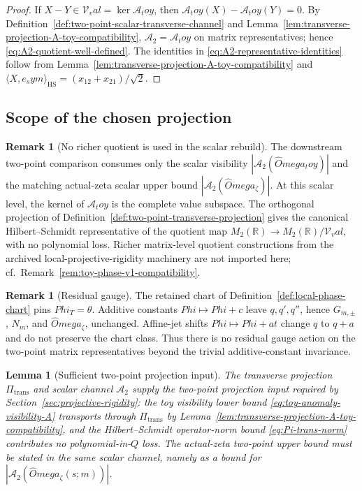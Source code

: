 \documentclass[11pt,a4paper]{amsart}
\def\Omega{Omega}%
\def\Phi{Phi}%
\def\toy{toy}%
\def\val{val}%
\def\sym{sym}%
\numberwithin{equation}{section}
\theoremstyle{plain}
\newtheorem{lemma}[theorem]{Lemma}
\theoremstyle{definition}
\newtheorem{remark}[theorem]{Remark}
\newcommand{\z}{\zeta}
\newcommand{\Om}{\Omega}
\newcommand{\Ph}{\Phi}
\newcommand{\sym}{\mathrm{sym}}
\newcommand{\toy}{\mathrm{toy}}
\newcommand{\val}{\mathrm{val}}
\newcommand{\trans}{\mathrm{trans}}
\begin{document}
\begin{proof}
If \(X-Y\in\mathcal V_\val=\ker\mathcal A_\toy\), then
\(\mathcal A_\toy(X)-\mathcal A_\toy(Y)=0\).  By
Definition~\ref{def:two-point-scalar-transverse-channel} and
Lemma~\ref{lem:transverse-projection-A-toy-compatibility},
\(\mathcal A_2=\mathcal A_\toy\) on matrix representatives; hence
\eqref{eq:A2-quotient-well-defined}.  The identities in
\eqref{eq:A2-representative-identities} follow from
Lemma~\ref{lem:transverse-projection-A-toy-compatibility} and
\(\langle X,e_\sym\rangle_{\mathrm{HS}}=(x_{12}+x_{21})/\sqrt2\).
\end{proof}

\subsection{Scope of the chosen projection}
\label{subsec:transverse-projection-scope}

\begin{remark}[No richer quotient is used in the scalar rebuild]
\label{rem:transverse-projection-no-richer-quotient}
The downstream two-point comparison consumes only the scalar
visibility \(|\mathcal A_2(\widehat\Om_\toy)|\) and the matching
actual-zeta scalar upper bound
\(|\mathcal A_2(\widehat\Om_\z)|\).  At this scalar level, the kernel
of \(\mathcal A_\toy\) is the complete value subspace.  The
orthogonal projection of
Definition~\ref{def:two-point-transverse-projection} gives the canonical
Hilbert--Schmidt representative of the quotient map
\(M_2(\mathbb R)\to M_2(\mathbb R)/\mathcal V_\val\), with no
polynomial loss.  Richer matrix-level quotient constructions from the
archived local-projective-rigidity machinery are not imported here;
cf.\ Remark~\ref{rem:toy-phase-v1-compatibility}.
\end{remark}

\begin{remark}[Residual gauge]
\label{rem:transverse-projection-residual-gauge}
The retained chart of Definition~\ref{def:local-phase-chart} pins
\(\Ph_T=\theta\).  Additive constants \(\Ph\mapsto\Ph+c\) leave
\(q,q',q''\), hence \(G_{m,\pm}\), \(N_m\), and \(\widehat\Om_\z\),
unchanged.  Affine-jet shifts \(\Ph\mapsto\Ph+at\) change \(q\) to
\(q+a\) and do not preserve the chart class.  Thus there is no
residual gauge action on the two-point matrix representatives beyond
the trivial additive-constant invariance.
\end{remark}

\begin{lemma}[Sufficient two-point projection input]
\label{lem:transverse-projection-sufficient}
The transverse projection \(\Pi_\trans\) and scalar channel
\(\mathcal A_2\) supply the two-point projection input required by
Section~\ref{sec:projective-rigidity}: the toy visibility lower bound
\eqref{eq:toy-anomaly-visibility-A} transports through
\(\Pi_\trans\) by
Lemma~\ref{lem:transverse-projection-A-toy-compatibility}, and the
Hilbert--Schmidt operator-norm bound
\eqref{eq:Pi-trans-norm} contributes no polynomial-in-\(Q\) loss.
The actual-zeta two-point upper bound must be stated in the same
scalar channel, namely as a bound for
\(|\mathcal A_2(\widehat\Om_\z(s;m))|\).
\end{lemma}
\end{document}
